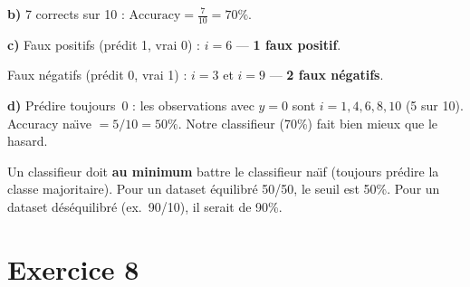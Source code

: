 \textbf{b)} 7 corrects sur 10 : $\text{Accuracy} = \frac{7}{10} = \boxed{70\%}$.

\textbf{c)} Faux positifs (pr\'{e}dit 1, vrai 0) : $i = 6$ --- \textbf{1 faux positif}.

Faux n\'{e}gatifs (pr\'{e}dit 0, vrai 1) : $i = 3$ et $i = 9$ --- \textbf{2 faux n\'{e}gatifs}.

\textbf{d)} Pr\'{e}dire toujours~0 : les observations avec $y = 0$ sont $i = 1, 4, 6, 8, 10$ (5 sur 10).
Accuracy na\"{\i}ve $= 5/10 = 50\%$. Notre classifieur (70\%) fait bien mieux que le hasard.

\begin{retenirbox}
    Un classifieur doit \textbf{au minimum} battre le classifieur na\"{\i}f (toujours pr\'{e}dire la classe majoritaire).
    Pour un dataset \'{e}quilibr\'{e} 50/50, le seuil est 50\%. Pour un dataset d\'{e}s\'{e}quilibr\'{e} (ex.\ 90/10),
    il serait de 90\%.
\end{retenirbox}

\section*{Exercice 8 \hfill \exointermediaire}

\separateur

